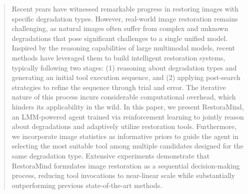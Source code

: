 \begin{abstract}
Recent years have witnessed remarkable progress in restoring images with specific degradation types. However, real-world image restoration remains challenging, as natural images often suffer from complex and unknown degradations that pose significant challenges to a single unified model. Inspired by the reasoning capabilities of large multimodal models, recent methods have leveraged them to build intelligent restoration systems, typically following two stages: (1) reasoning about degradation types and generating an initial tool execution sequence, and (2) applying post-search strategies to refine the sequence through trial and error. The iterative nature of this process incurs considerable computational overhead, which hinders its applicability in the wild. In this paper, we present RestoraMind, an LMM-powered agent trained via reinforcement learning to jointly reason about degradations and adaptively utilize restoration tools. Furthermore, we incorporate image statistics as informative priors to guide the agent in selecting the most suitable tool among multiple candidates designed for the same degradation type. Extensive experiments demonstrate that RestoraMind formulates image restoration as a sequential decision-making process, reducing tool invocations to near-linear scale while substantially outperforming previous state-of-the-art methods.
\end{abstract}